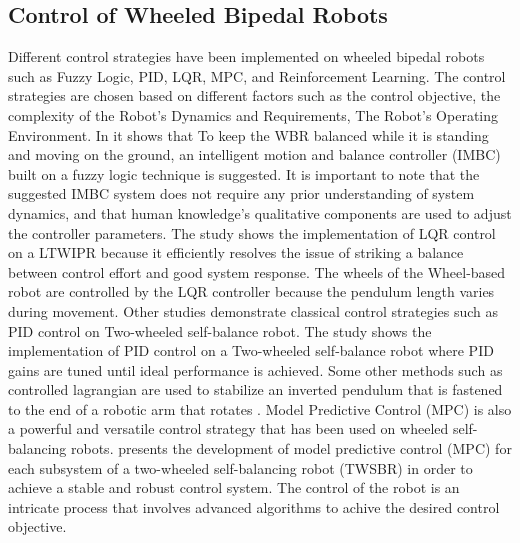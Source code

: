 \subsection{Control of Wheeled Bipedal Robots}
Different control strategies have been implemented on wheeled bipedal robots such as Fuzzy Logic, PID, LQR, MPC, and Reinforcement Learning.
The control strategies are chosen based on different factors such as the control objective, the complexity of the Robot's Dynamics and Requirements, The Robot's Operating Environment. In \cite{hsu2022implementation} it shows that To keep the WBR balanced while it is standing and moving on the ground, an intelligent motion and balance controller (IMBC) built on a fuzzy logic technique is suggested.
It is important to note that the suggested IMBC system does not require any prior understanding of system dynamics, and that human knowledge's qualitative components are used to adjust the controller parameters. The study \cite {cui2022modeling} shows the implementation of LQR control on a LTWIPR because it efficiently resolves the issue of striking a balance between control effort and good system response.
The wheels of the Wheel-based robot are controlled by the LQR controller because the pendulum length varies during movement.
Other studies demonstrate classical control strategies such as PID control on Two-wheeled self-balance robot.
The study \cite{zimit2018modelling} shows the implementation of PID control on a Two-wheeled self-balance robot where PID gains are tuned until ideal performance is achieved.
Some other methods such as controlled lagrangian are used to stabilize an inverted pendulum that is fastened to the end of a robotic arm that rotates \cite{bloch1999stabilization}.
Model Predictive Control (MPC) is also a powerful and versatile control strategy that has been used on wheeled self-balancing robots. \cite{azimi2013model} presents the development of model predictive control (MPC) for each subsystem of a two-wheeled self-balancing robot (TWSBR) in order to achieve a stable and robust control system. The control of the robot is an intricate process that involves advanced algorithms to achive the desired control objective.
\vspace{3 cm}

